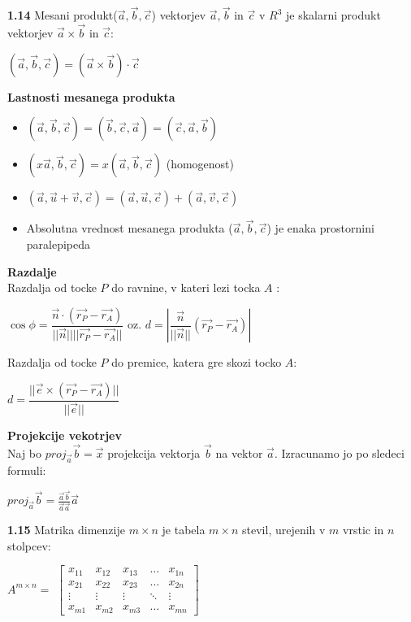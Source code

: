 \documentclass{article}
\begin{document}
\begin{multicols}{3}
\textbf{1.14} Mesani produkt($\vec{a}, \vec{b}, \vec{c}$) vektorjev
$\vec{a}, \vec{b}$ in $\vec{c}$ v $R^{3}$ je skalarni produkt vektorjev
$\vec{a} \times \vec{b}$ in $\vec{c}$:
\begin{center}
    $(\vec{a}, \vec{b}, \vec{c}) = (\vec{a} \times \vec{b})\cdot \vec{c}$
\end{center}

\textbf{Lastnosti mesanega produkta}
\begin{itemize}
    \item $(\vec{a}, \vec{b}, \vec{c}) = (\vec{b}, \vec{c}, \vec{a}) = (\vec{c}, \vec{a}, \vec{b})$
    \item $(x\vec{a}, \vec{b}, \vec{c}) = x(\vec{a}, \vec{b}, \vec{c})$ (homogenost)
    \item $(\vec{a}, \vec{u} + \vec{v}, \vec{c}) = (\vec{a}, \vec{u}, \vec{c}) + (\vec{a}, \vec{v}, \vec{c})$
    \item Absolutna vrednost mesanega produkta ($\vec{a}, \vec{b}, \vec{c}$) je enaka prostornini paralepipeda
\end{itemize}

\textbf{Razdalje}\\
Razdalja od tocke $P$ do ravnine, v kateri lezi tocka $A$ :
\begin{center}
    $\cos\phi = \dfrac{\vec{n} \cdot ( \vec{r_{P}} - \vec{r_{A}})} {||\vec{n}|| ||\vec{r_{P}} - \vec{r_{A}}||}$ oz.
    $d = |\dfrac{\vec{n}}{||\vec{n}||} ( \vec{r_{P}} - \vec{r_{A}})|$
\end{center}
Razdalja od tocke $P$ do premice, katera gre skozi tocko $A$:
\begin{center}
    $d = \dfrac{||\vec{e} \times ( \vec{r_{P}} - \vec{r_{A}})||}{||\vec{e}||}$
\end{center}

\textbf{Projekcije vekotrjev}\\
Naj bo $proj_{\vec{a}}\vec{b} = \vec{x}$ projekcija vektorja $\vec{b}$ na vektor $\vec{a}$.
Izracunamo jo po sledeci formuli:
\begin{center}
    \begin{math}
        proj_{\vec{a}}\vec{b} = \frac{\vec{a}\vec{b}}{\vec{a}\vec{a}} \vec{a}
    \end{math}
\end{center}

\textbf{1.15} Matrika dimenzije $m \times n$ je tabela $m \times n$ stevil, urejenih
v $m$ vrstic in $n$ stolpcev:
\begin{center}
    $A^{m \times n} =$
    $\begin{bmatrix}
        x_{11} & x_{12} & x_{13} & \dots  & x_{1n} \\
        x_{21} & x_{22} & x_{23} & \dots  & x_{2n} \\
        \vdots & \vdots & \vdots & \ddots & \vdots \\
        x_{m1} & x_{m2} & x_{m3} & \dots  & x_{mn}
    \end{bmatrix}$
\end{center}


\end{multicols}
\end{document}
